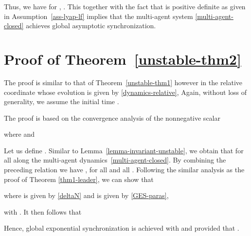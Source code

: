 \documentclass[a4paper, 11pt]{article}
\begin{document}
Thus, we have for , . This together with the fact that  is positive definite as given in Assumption~\ref{ass-lyap-lf} implies that the multi-agent system \eqref{multi-agent-closed} achieves global asymptotic synchronization.


\section{Proof of Theorem~\ref{unstable-thm2}}\label{app-lf3}
The proof is similar to that of Theorem~\ref{unstable-thm1} however in the relative coordinate  whose evolution is given by \eqref{dynamics-relative}, Again, without loss of generality, we assume the initial time .

The proof is based on the convergence analysis of the nonnegative scalar

where  and



Let us define .
Similar to Lemma~\ref{lemma-invariant-unstable}, we obtain that  for all  along the multi-agent dynamics~\eqref{multi-agent-closed}.
By combining the preceding relation we have , for all  and all .
Following the similar analysis as the proof of Theorem \ref{thm1-leader}, we can show that

where  is given by  \eqref{deltaN} and  is given by \eqref{GES-paras},

with . It then follows that

Hence, global exponential synchronization is achieved with  and  provided that . 
\end{document}
